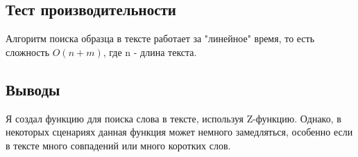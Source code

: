 \documentclass[12pt]{article}
\begin{document}
\newpage
\subsection*{Тест производительности}

Алгоритм поиска образца в тексте работает за "линейное" время, то есть сложность $O(n+m)$, где n - длина текста.



\newpage
\subsection*{Выводы}


Я создал функцию для поиска слова в тексте, используя Z-функцию. 
Однако, в некоторых сценариях данная функция может немного замедляться,
 особенно если в тексте много совпадений или много коротких слов.
\end{document}
